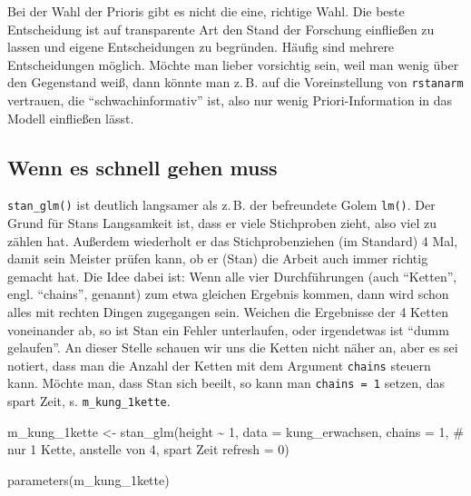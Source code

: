 \documentclass[
  ngerman,
  letterpaper,
  twoside,
  open=any]{scrbook}
\newenvironment{Shaded}{\begin{snugshade}}{\end{snugshade}}
\newcommand{\AttributeTok}[1]{\textcolor[rgb]{0.40,0.45,0.13}{#1}}
\newcommand{\CommentTok}[1]{\textcolor[rgb]{0.37,0.37,0.37}{#1}}
\newcommand{\DecValTok}[1]{\textcolor[rgb]{0.68,0.00,0.00}{#1}}
\newcommand{\FunctionTok}[1]{\textcolor[rgb]{0.28,0.35,0.67}{#1}}
\newcommand{\NormalTok}[1]{\textcolor[rgb]{0.00,0.23,0.31}{#1}}
\newcommand{\OtherTok}[1]{\textcolor[rgb]{0.00,0.23,0.31}{#1}}
\newcommand{\SpecialCharTok}[1]{\textcolor[rgb]{0.37,0.37,0.37}{#1}}
\theoremstyle{definition}
\theoremstyle{plain}
\theoremstyle{definition}
\theoremstyle{definition}
\theoremstyle{definition}
\theoremstyle{definition}
\theoremstyle{remark}
\begin{document}
\begin{tcolorbox}[enhanced jigsaw, arc=.35mm, bottomrule=.15mm, bottomtitle=1mm, breakable, colback=white, colbacktitle=quarto-callout-important-color!10!white, colframe=quarto-callout-important-color-frame, coltitle=black, left=2mm, leftrule=.75mm, opacityback=0, opacitybacktitle=0.6, rightrule=.15mm, title=\textcolor{quarto-callout-important-color}{\faExclamation}\hspace{0.5em}{Wichtig}, titlerule=0mm, toprule=.15mm, toptitle=1mm]

Bei der Wahl der Prioris gibt es nicht die eine, richtige Wahl. Die
beste Entscheidung ist auf transparente Art den Stand der Forschung
einfließen zu lassen und eigene Entscheidungen zu begründen. Häufig sind
mehrere Entscheidungen möglich. Möchte man lieber vorsichtig sein, weil
man wenig über den Gegenstand weiß, dann könnte man z.\,B. auf die
Voreinstellung von \texttt{rstanarm} vertrauen, die
\enquote{schwachinformativ} ist, also nur wenig Priori-Information in
das Modell einfließen lässt.

\end{tcolorbox}

\subsection{Wenn es schnell gehen
muss}\label{wenn-es-schnell-gehen-muss}

\texttt{stan\_glm()} ist deutlich langsamer als z.\,B. der befreundete
Golem \texttt{lm()}. Der Grund für Stans Langsamkeit ist, dass er viele
Stichproben zieht, also viel zu zählen hat. Außerdem wiederholt er das
Stichprobenziehen (im Standard) 4 Mal, damit sein Meister prüfen kann,
ob er (Stan) die Arbeit auch immer richtig gemacht hat. Die Idee dabei
ist: Wenn alle vier Durchführungen (auch \enquote{Ketten}, engl.
\enquote{chains}, genannt) zum etwa gleichen Ergebnis kommen, dann wird
schon alles mit rechten Dingen zugegangen sein. Weichen die Ergebnisse
der 4 Ketten voneinander ab, so ist Stan ein Fehler unterlaufen, oder
irgendetwas ist \enquote{dumm gelaufen}. An dieser Stelle schauen wir
uns die Ketten nicht näher an, aber es sei notiert, dass man die Anzahl
der Ketten mit dem Argument \texttt{chains} steuern kann. Möchte man,
dass Stan sich beeilt, so kann man \texttt{chains\ =\ 1} setzen, das
spart Zeit, s. \texttt{m\_kung\_1kette}.

\begin{Shaded}
\begin{Highlighting}[]
\NormalTok{m\_kung\_1kette }\OtherTok{\textless{}{-}} \FunctionTok{stan\_glm}\NormalTok{(height }\SpecialCharTok{\textasciitilde{}} \DecValTok{1}\NormalTok{, }
                 \AttributeTok{data =}\NormalTok{ kung\_erwachsen, }
                 \AttributeTok{chains =} \DecValTok{1}\NormalTok{,  }\CommentTok{\# nur 1 Kette, anstelle von 4, spart Zeit}
                 \AttributeTok{refresh =} \DecValTok{0}\NormalTok{) }

\FunctionTok{parameters}\NormalTok{(m\_kung\_1kette)  }
\end{Highlighting}
\end{Shaded}
\end{document}
